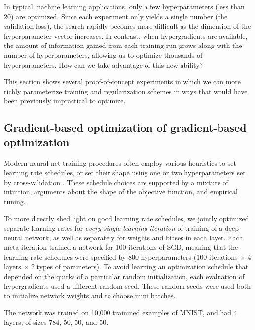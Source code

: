 \documentclass{article}
\begin{document}
In typical machine learning applications, only a few hyperparameters (less than 20) are optimized.
Since each experiment only yields a single number (the validation loss), the search rapidly becomes more difficult as the dimension of the hyperparameter vector increases.
In contrast, when hypergradients are available, the amount of information gained from each training run grows along with the number of hyperparameters, allowing us to optimize thousands of hyperparameters. %
How can we take advantage of this new ability?

This section shows several proof-of-concept experiments in which we can more richly parameterize training and regularization schemes in ways that would have been previously impractical to optimize.

\subsection{Gradient-based optimization of gradient-based optimization}
\label{sec:schedule experiments}
Modern neural net training procedures often employ various heuristics to set learning rate schedules, or set their shape using one or two hyperparameters set by cross-validation \cite{lecun1989backpropagation, dahl2014multi, sutskever2013importance}.
These schedule choices are supported by a mixture of intuition, arguments about the shape of the objective function, and empirical tuning.

To more directly shed light on good learning rate schedules, we jointly optimized separate learning rates for \emph{every single learning iteration} of training of a deep neural network, as well as separately for weights and biases in each layer.
Each meta-iteration trained a network for 100 iterations of SGD, meaning that the learning rate schedules were specified by 800 hyperparameters (100 iterations $\times$ 4 layers $\times$ 2 types of parameters).
To avoid learning an optimization schedule that depended on the quirks of a particular random initialization, each evaluation of hypergradients used a different random seed.
These random seeds were used both to initialize network weights and to choose mini batches.

The network was trained on 10,000 trainined examples of MNIST, and had 4 layers, of sizes 784, 50, 50, and 50.
\end{document}
